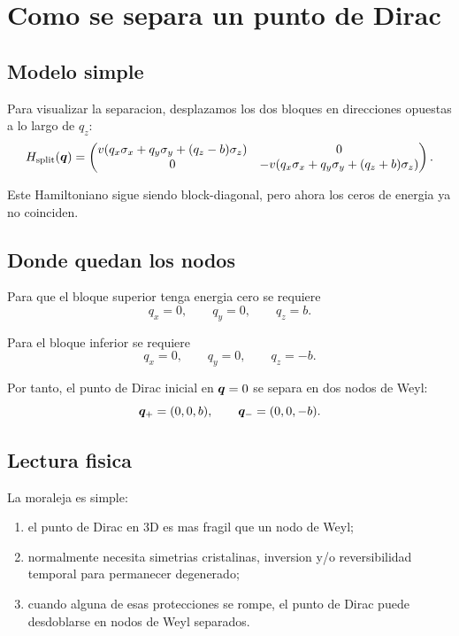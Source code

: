 \section{Como se separa un punto de Dirac}

\subsection{Modelo simple}

Para visualizar la separacion, desplazamos los dos bloques en direcciones opuestas a lo largo de \(q_z\):
\begin{equation}
H_{\text{split}}(\bm{q})=
\begin{pmatrix}
v(q_x\sigma_x+q_y\sigma_y+(q_z-b)\sigma_z) & 0\\
0 & -v(q_x\sigma_x+q_y\sigma_y+(q_z+b)\sigma_z)
\end{pmatrix}.
\label{c06:eq:split-model}
\end{equation}

Este Hamiltoniano sigue siendo block-diagonal, pero ahora los ceros de energia ya no coinciden.

\subsection{Donde quedan los nodos}

Para que el bloque superior tenga energia cero se requiere
\begin{equation}
q_x=0,\qquad q_y=0,\qquad q_z=b.
\end{equation}

Para el bloque inferior se requiere
\begin{equation}
q_x=0,\qquad q_y=0,\qquad q_z=-b.
\end{equation}

Por tanto, el punto de Dirac inicial en \(\bm{q}=0\) se separa en dos nodos de Weyl:
\begin{equation}
\bm{q}_+= (0,0,b),
\qquad
\bm{q}_-=(0,0,-b).
\label{c06:eq:node-separation}
\end{equation}

\subsection{Lectura fisica}

La moraleja es simple:

\begin{enumerate}[leftmargin=*]
  \item el punto de Dirac en 3D es mas fragil que un nodo de Weyl;
  \item normalmente necesita simetrias cristalinas, inversion y/o reversibilidad temporal para permanecer degenerado;
  \item cuando alguna de esas protecciones se rompe, el punto de Dirac puede desdoblarse en nodos de Weyl separados.
\end{enumerate}

